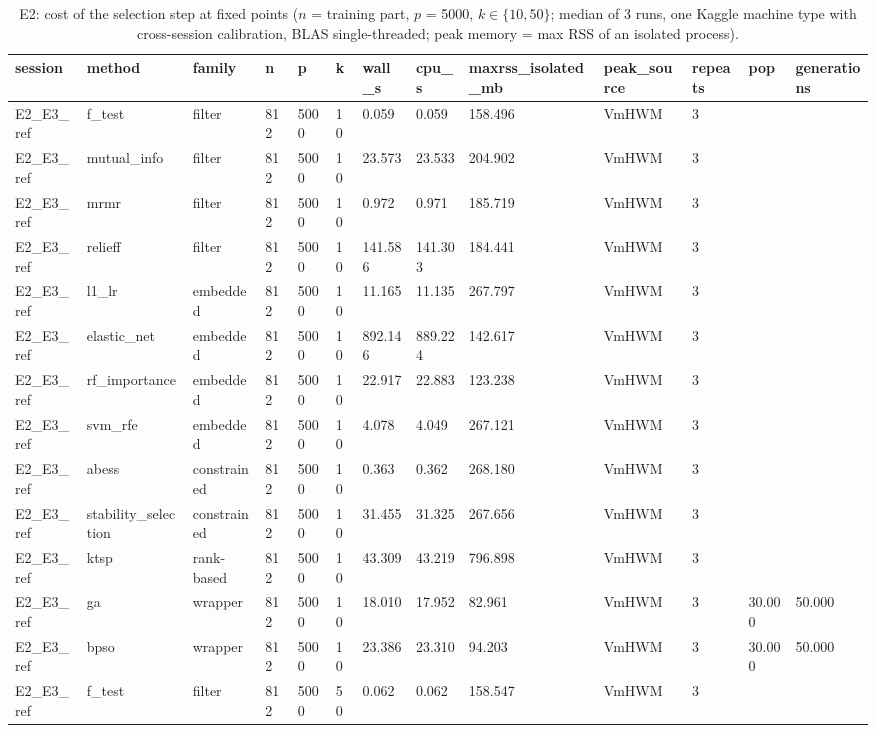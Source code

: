 \begin{table}[t]
  \centering
  \caption{E2: cost of the selection step at fixed points ($n$ = training part, $p$ = 5000, $k \in \{10, 50\}$; median of 3 runs, one Kaggle machine type with cross-session calibration, BLAS single-threaded; peak memory = max RSS of an isolated process).}
  \label{tab:e2_cost}
  \small
  \begin{tabular}{lllllllllllll}
    \toprule
    session & method & family & n & p & k & wall\_s & cpu\_s & maxrss\_isolated\_mb & peak\_source & repeats & pop & generations \\
    \midrule
    E2\_E3\_ref & f\_test & filter & 812 & 5000 & 10 & 0.059 & 0.059 & 158.496 & VmHWM & 3 &  &  \\
    E2\_E3\_ref & mutual\_info & filter & 812 & 5000 & 10 & 23.573 & 23.533 & 204.902 & VmHWM & 3 &  &  \\
    E2\_E3\_ref & mrmr & filter & 812 & 5000 & 10 & 0.972 & 0.971 & 185.719 & VmHWM & 3 &  &  \\
    E2\_E3\_ref & relieff & filter & 812 & 5000 & 10 & 141.586 & 141.303 & 184.441 & VmHWM & 3 &  &  \\
    E2\_E3\_ref & l1\_lr & embedded & 812 & 5000 & 10 & 11.165 & 11.135 & 267.797 & VmHWM & 3 &  &  \\
    E2\_E3\_ref & elastic\_net & embedded & 812 & 5000 & 10 & 892.146 & 889.224 & 142.617 & VmHWM & 3 &  &  \\
    E2\_E3\_ref & rf\_importance & embedded & 812 & 5000 & 10 & 22.917 & 22.883 & 123.238 & VmHWM & 3 &  &  \\
    E2\_E3\_ref & svm\_rfe & embedded & 812 & 5000 & 10 & 4.078 & 4.049 & 267.121 & VmHWM & 3 &  &  \\
    E2\_E3\_ref & abess & constrained & 812 & 5000 & 10 & 0.363 & 0.362 & 268.180 & VmHWM & 3 &  &  \\
    E2\_E3\_ref & stability\_selection & constrained & 812 & 5000 & 10 & 31.455 & 31.325 & 267.656 & VmHWM & 3 &  &  \\
    E2\_E3\_ref & ktsp & rank-based & 812 & 5000 & 10 & 43.309 & 43.219 & 796.898 & VmHWM & 3 &  &  \\
    E2\_E3\_ref & ga & wrapper & 812 & 5000 & 10 & 18.010 & 17.952 & 82.961 & VmHWM & 3 & 30.000 & 50.000 \\
    E2\_E3\_ref & bpso & wrapper & 812 & 5000 & 10 & 23.386 & 23.310 & 94.203 & VmHWM & 3 & 30.000 & 50.000 \\
    E2\_E3\_ref & f\_test & filter & 812 & 5000 & 50 & 0.062 & 0.062 & 158.547 & VmHWM & 3 &  &  \\

\end{tabular}
\end{table}
